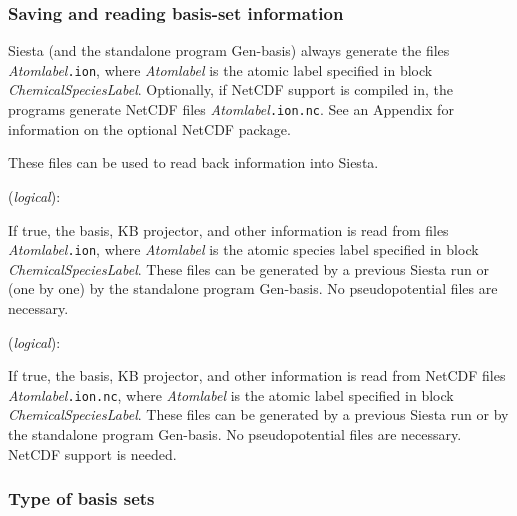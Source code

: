 \documentclass[11pt]{article}
\begin{document}
\subsubsection{Saving and reading basis-set information}

{\sc Siesta} (and the standalone program {\sc Gen-basis}) 
always generate the files
{\it Atomlabel}{\tt .ion}, where {\it Atomlabel} is the atomic label
specified in block {\it ChemicalSpeciesLabel}.  Optionally, if
NetCDF support is compiled in, the programs generate
NetCDF files 
{\it Atomlabel}{\tt .ion.nc}.
See an Appendix for information on the optional NetCDF package.

These files can be used to read back information into {\sc Siesta}.

\begin{description}
\itemsep 10pt
\parsep 0pt
\item[{\bf User.Basis}] ({\it logical}): 

If true, the basis, KB projector, and other information is read from
files {\it Atomlabel}{\tt .ion}, where {\it Atomlabel} is the atomic
species label specified in block {\it ChemicalSpeciesLabel}. These
files can be generated by a previous {\sc Siesta} run or (one by one) by the
standalone program {\sc Gen-basis}. No pseudopotential
files are necessary.

\item[{\bf User.Basis.NetCDF}] ({\it logical}): 

If true, the basis, KB projector, and other information is read from
NetCDF files {\it Atomlabel}{\tt .ion.nc}, where {\it Atomlabel} is
the atomic label specified in block {\it ChemicalSpeciesLabel}. These
files can be generated by a previous {\sc Siesta} run or by the
standalone program {\sc Gen-basis}. No pseudopotential
files are necessary. NetCDF support is needed.

\end{description}

\subsubsection{Type of basis sets}
\end{document}
